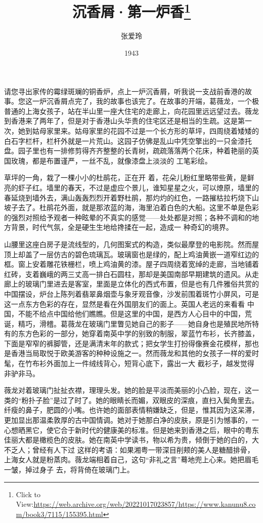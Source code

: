 \documentclass{article}
\title{沉香屑·第一炉香\footnote{Click to View:\url{https://web.archive.org/web/20221017023857/https://www.kanunu8.com/book3/7115/155395.html}}}
\author{张爱玲}
\date{1943}
\begin{document}

\maketitle


\Large

请您寻出家传的霉绿斑斓的铜香炉，点上一炉沉香屑，听我说一支战前香港的故事。您这一炉沉香屑点完了，我的故事也该完了。在故事的开端，葛薇龙，一个极普通的上海女孩子，站在半山里一座大住宅的走廊上，向花园里远远望过去。薇龙到香港来了两年了，但是对于香港山头华贵的住宅区还是相当的生疏。这是第一次，她到姑母家里来。姑母家里的花园不过是一个长方形的草坪，四周绕着矮矮的白石字栏杆，栏杆外就是一片荒山。这园子仿佛是乱山中凭空擎出的一只金漆托盘。园子里也有一排修剪得齐齐整整的长青树，疏疏落落两个花床，种着艳丽的英国玫瑰，都是布置谨严，一丝不乱，就像漆盘上淡淡的
工笔彩绘。 

草坪的一角，栽了一棵小小的杜鹃花，正在开
\newpage
着，花朵儿粉红里略带些黄，是鲜亮的虾子红。墙里的春天，不过是虚应个景儿，谁知星星之火，可以燎原，墙里的春延烧到墙外去，满山轰轰烈烈开着野杜鹃，那灼灼的红色，一路摧枯拉朽烧下山坡子去了。杜鹃花外面，就是那浓蓝的海，海里泊着白色的大船。这里不单是色彩的强烈对照给予观者一种眩晕的不真实的感觉——处处都是对照；各种不调和的地方背景，时代气氛，全是硬生生地给搀揉在一起，造成一
种奇幻的境界。 

山腰里这座白房子是流线型的，几何图案式的构造，类似最摩登的电影院。然而屋顶上却盖了一层仿古的碧色琉璃瓦。玻璃窗也是绿的，配上鸡油黄嵌一道窄红边的框。窗上安着雕花铁栅栏，喷上鸡油黄的漆。屋子四周绕着宽绰的走廊，当地铺着红砖，支着巍峨的两三丈高一排白石圆柱，那却是美国南部早期建筑的遗风。从走廊上的玻璃门里进去是客室，里面是立体化的西式布置，但是也有几件雅俗共赏的中国摆设，炉台上陈列着翡翠鼻烟壶与象牙观音像，沙发前围着斑竹小屏风，可是这一点东方色彩的存在，显然是看在外国朋友们的面上。英国人老远的来看看
\newpage
中国，不能不给点中国给他们瞧瞧。但是这里的中国，是西方人心目中的中国，荒诞，精巧，滑稽。葛薇龙在玻璃门里瞥见她自己的影子——她自身也是殖民地所特有的东方色彩的一部分，她穿着南英中学的别致的制服，翠蓝竹布衫，长齐膝盖，下面是窄窄的裤脚管，还是满清末年的款式；把女学生打扮得像赛金花模样，那也是香港当局取悦于欧美游客的种种设施之一。然而薇龙和其他的女孩子一样的爱时髦，在竹布衫外面加上一件绒线背心，短背心底下，露出一大
截衫子，越发觉得非驴非马。 

薇龙对着玻璃门扯扯衣襟，理理头发。她的脸是平淡而美丽的小凸脸，现在，这一类的“粉扑子脸”是过了时了。她的眼睛长而媚，双眼皮的深痕，直扫入鬓角里去。纤瘦的鼻子，肥圆的小嘴。也许她的面部表情稍嫌缺乏，但是，惟其因为这呆滞，更加显出那温柔敦厚的古中国情调。她对于她那白净的皮肤，原是引为憾事的，一心想晒黑它，使它合于新时代的健康美的标准。但是她来到香港之后，眼中的粤东佳丽大都是橄榄色的皮肤。她在南英中学读书，物以希为贵，倾倒于她的白的，大不乏人；曾经有人下过
\newpage
这样的考语：如果湘粤一带深目削颊的美人是糖醋排骨，上海女人就是粉蒸肉。薇龙端相着自己，这句“非礼之言”蓦地兜上心来。她把眉毛一皱，掉过身子
去，将背倚在玻璃门上。 
\end{document}
